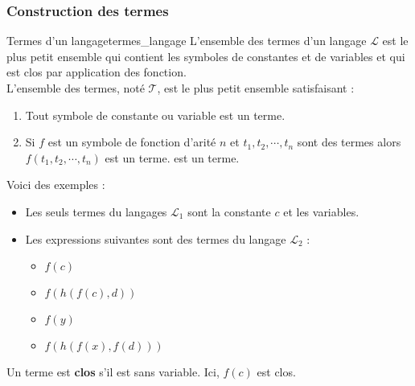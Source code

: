 \subsubsection{Construction des termes}
\label{subsubsec:construction_termes}
\begin{definition}{Termes d'un langage}{termes_langage}
    L'ensemble des termes d'un langage $\mathcal{L}$ est le plus petit ensemble qui contient les symboles de constantes et de
    variables et qui est clos par application des fonction.\\
    L'ensemble des termes, noté $\mathcal{T}$, est le plus petit ensemble satisfaisant :
    \begin{enumerate}
        \item Tout symbole de constante ou variable est un terme.
        \item Si $f$ est un symbole de fonction d'arité $n$ et $t_1,t_2,\cdots,t_n$ sont des termes alors $f(t_1,t_2,\cdots,t_n)$ est un terme.
        est un terme.
    \end{enumerate}
\end{definition}
\begin{example}
    Voici des exemples :
    \begin{itemize}[label=\textbullet]
        \item Les seuls termes du langages $\mathcal{L}_1$ sont la constante $c$ et les variables.
        \item Les expressions suivantes sont des termes du langage $\mathcal{L}_2$ : 
        \begin{itemize}[label=\textbullet]
            \item $f(c)$
            \item $f(h(f(c),d))$
            \item $f(y)$
            \item $f(h(f(x),f(d)))$
        \end{itemize}
    \end{itemize}
\end{example}
\noindent Un terme est \textbf{clos} s'il est sans variable. Ici, $f(c)$ est clos.

